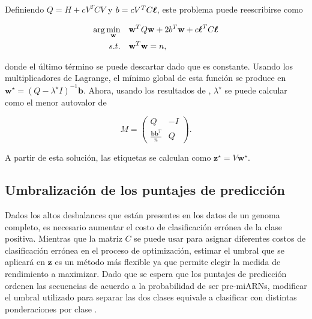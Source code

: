 \noindent Definiendo $ Q = H + c V ^ T C V $ y $ b = c V ^ T C \boldsymbol\ell $, este problema puede reescribirse como

\begin{equation}
	\begin{split}
		\arg\min_{\mathbf{w}} &\quad \mathbf{w}^T Q \mathbf{w} + 2 b^T \mathbf{w} + c \boldsymbol\ell^T C \boldsymbol\ell \\
		s.t. &\quad \mathbf{w}^T \mathbf{w} = n,
	\end{split}
\end{equation}

\noindent donde el último término se puede descartar dado que es constante. Usando los multiplicadores de Lagrange, el mínimo global de esta función se
produce en $\mathbf {w}^\star = (Q - \lambda^\star I)^{- 1} \mathbf{b} $. Ahora, usando los resultados de \cite{gander1989contrained}, $ \lambda^\star$
se puede calcular como el menor autovalor de

\begin{equation}
	M = \left( \begin{array}{cc}
			Q & -I \\
	\frac{{\mathbf{b} \mathbf{b}^T}}{{n}} & Q \end{array} \right).
\end{equation}

\noindent A partir de esta solución, las etiquetas se calculan como $ \mathbf {z} ^ \star = V \mathbf {w} ^ \star $.

\subsection{Umbralización de los puntajes de predicción}

Dados los altos desbalances que están presentes en los datos de un genoma completo, es necesario aumentar el costo de clasificación errónea de la clase
positiva. Mientras que la matriz $C$ se puede usar para asignar diferentes costos de clasificación errónea en el proceso de optimización, estimar el umbral
que se aplicará en $\mathbf{z}$ es un método más flexible ya que permite elegir la medida de rendimiento a maximizar. Dado que se espera que los puntajes de
predicción ordenen las secuencias de acuerdo a la probabilidad de ser pre-miARNs, modificar el umbral utilizado para separar las dos clases equivale a
clasificar con distintas ponderaciones por clase \citep{mease2007boosted}.

